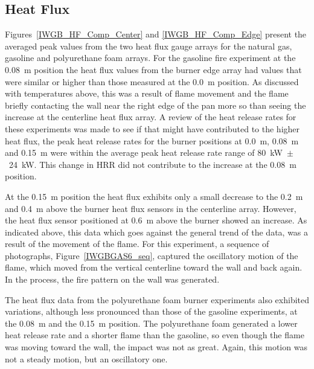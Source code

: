 \documentclass[twoside]{uocthesis}
\begin{document}
{\subsection{Heat Flux}

Figures~\ref{IWGB_HF_Comp_Center} and \ref{IWGB_HF_Comp_Edge} present the averaged peak values from the two heat flux gauge arrays for the natural gas, gasoline and polyurethane foam arrays.  For the gasoline fire experiment at the 0.08~m position the heat flux values from the burner edge array had values that were similar or higher than those measured at the 0.0~m position. As discussed with temperatures above, this was a result of flame movement and the flame briefly contacting the wall near the right edge of the pan more so than seeing the increase at the centerline heat flux array.  A review of the heat release rates for these experiments was made to see if that might have contributed to the higher heat flux, the peak heat release rates for the burner positions at 0.0~m, 0.08~m and 0.15~m were within the average peak heat release rate range of 80~kW~$\pm$~24~kW.  This change in HRR did not contribute to the increase at the 0.08~m position.  

At the 0.15~m position the heat flux exhibits only a small decrease to the 0.2~m and 0.4~m above the burner heat flux sensors in the centerline array.  However, the heat flux sensor positioned at 0.6~m above the burner showed an increase.  As indicated above, this data which goes against the general trend of the data, was a result of the movement of the flame.  For this experiment, a sequence of photographs, Figure~\ref{IWGBGAS6_seq}, captured the oscillatory motion of the flame, which moved from the vertical centerline toward the wall and back again.  In the process, the fire pattern on the wall was generated.    

The heat flux data from the polyurethane foam burner experiments also exhibited variations, although less pronounced than those of the gasoline experiments, at the 0.08~m and the 0.15~m position.  The polyurethane foam generated a lower heat release rate and a shorter flame than the gasoline, so even though the flame was moving toward the wall, the impact was not as great.  Again, this motion was not a steady motion, but an oscillatory one.      

}
\end{document}
